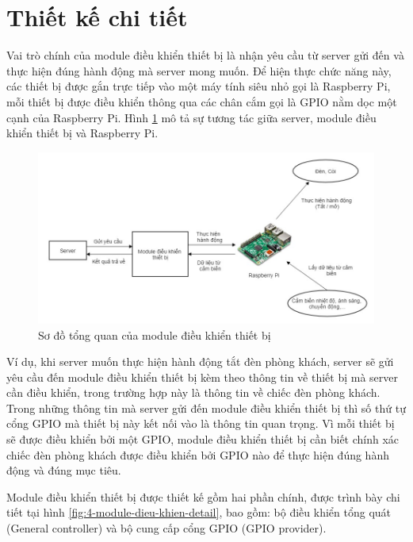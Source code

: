 \documentclass[11pt,a4paper,oneside]{book}
\begin{document}
\section{Thiết kế chi tiết}

Vai trò chính của module điều khiển thiết bị là nhận yêu cầu từ server gửi đến và thực hiện đúng hành động mà server mong muốn. Để hiện thực chức năng này, các thiết bị được gắn trực tiếp vào một máy tính siêu nhỏ gọi là Raspberry Pi, mỗi thiết bị được điều khiển thông qua các chân cắm gọi là GPIO nằm dọc một cạnh của Raspberry Pi. Hình \ref{fig:4-module-dieu-khien-overview} mô tả sự tương tác giữa server, module điều khiển thiết bị và Raspberry Pi.

\begin{figure}[h]
  \centering
     \includegraphics[scale=0.5]{4-module-dieu-khien-overview}
  \caption{Sơ đồ tổng quan của module điều khiển thiết bị}\label{fig:4-module-dieu-khien-overview}
\end{figure}

Ví dụ, khi server muốn thực hiện hành động tắt đèn phòng khách, server sẽ gửi yêu cầu đến module điều khiển thiết bị kèm theo thông tin về thiết bị mà server cần điều khiển, trong trường hợp này là thông tin về chiếc đèn phòng khách. Trong những thông tin mà server gửi đến module điều khiển thiết bị thì số thứ tự cổng GPIO mà thiết bị này kết nối vào là thông tin quan trọng. Vì mỗi thiết bị sẽ được điều khiển bởi một GPIO, module điều khiển thiết bị cần biết chính xác chiếc đèn phòng khách được điều khiển bởi GPIO nào để thực hiện đúng hành động và đúng mục tiêu.

Module điều khiển thiết bị được thiết kế gồm hai phần chính, được trình bày chi tiết tại hình \ref{fig:4-module-dieu-khien-detail}, bao gồm: bộ điều khiển tổng quát (General controller) và bộ cung cấp cổng GPIO (GPIO provider).
\end{document}
